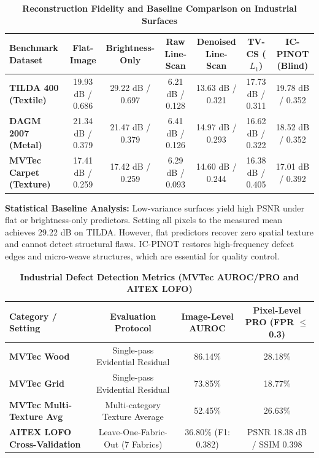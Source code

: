 \documentclass[10pt,a4paper]{article}
\begin{document}
\begin{table}[h]
\centering
\small
\caption{\textbf{Reconstruction Fidelity and Baseline Comparison on Industrial Surfaces}}
\label{tab:baselines}
\begin{tabular}{lcccccc}
\toprule
\textbf{Benchmark Dataset} & \textbf{Flat-Image} & \textbf{Brightness-Only} & \textbf{Raw Line-Scan} & \textbf{Denoised Line-Scan} & \textbf{TV-CS ($L_1$)} & \textbf{IC-PINOT (Blind)} \\
\midrule
\textbf{TILDA 400 (Textile)} & 19.93 dB / 0.686 & 29.22 dB / 0.697 & 6.21 dB / 0.128 & 13.63 dB / 0.321 & 17.73 dB / 0.311 & 19.78 dB / 0.352 \\
\textbf{DAGM 2007 (Metal)}   & 21.34 dB / 0.379 & 21.47 dB / 0.379 & 6.41 dB / 0.126 & 14.97 dB / 0.293 & 16.62 dB / 0.322 & 18.52 dB / 0.352 \\
\textbf{MVTec Carpet (Texture)} & 17.41 dB / 0.259 & 17.42 dB / 0.259 & 6.29 dB / 0.093 & 14.60 dB / 0.244 & 16.38 dB / 0.405 & 17.01 dB / 0.392 \\
\bottomrule
\end{tabular}
\end{table}

\textbf{Statistical Baseline Analysis:} Low-variance surfaces yield high PSNR under flat or brightness-only predictors. Setting all pixels to the measured mean achieves 29.22 dB on TILDA. However, flat predictors recover zero spatial texture and cannot detect structural flaws. IC-PINOT restores high-frequency defect edges and micro-weave structures, which are essential for quality control.

\begin{table}[h]
\centering
\small
\caption{\textbf{Industrial Defect Detection Metrics (MVTec AUROC/PRO and AITEX LOFO)}}
\label{tab:detection}
\begin{tabular}{lccc}
\toprule
\textbf{Category / Setting} & \textbf{Evaluation Protocol} & \textbf{Image-Level AUROC} & \textbf{Pixel-Level PRO (FPR $\le$ 0.3)} \\
\midrule
\textbf{MVTec Wood} & Single-pass Evidential Residual & 86.14\% & 28.18\% \\
\textbf{MVTec Grid} & Single-pass Evidential Residual & 73.85\% & 18.77\% \\
\textbf{MVTec Multi-Texture Avg} & Multi-category Texture Average & 52.45\% & 26.63\% \\
\textbf{AITEX LOFO Cross-Validation} & Leave-One-Fabric-Out (7 Fabrics) & 36.80\% (F1: 0.382) & PSNR 18.38 dB / SSIM 0.398 \\
\bottomrule
\end{tabular}
\end{table}
\end{document}
